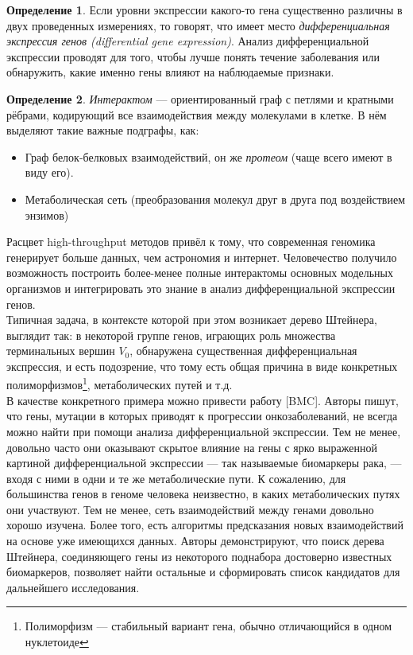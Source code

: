 \documentclass[11pt,a4paper]{report}
\theoremstyle{definition}
\theoremstyle{definition}
\theoremstyle{definition}
\newtheorem{definition}{Определение}[section]
\begin{document}
	\begin{definition}
		Если уровни экспрессии какого-то гена существенно различны в двух проведенных измерениях, то говорят, что имеет место \textit{дифференциальная экспрессия генов (differential gene expression)}. Анализ дифференциальной экспрессии проводят для того, чтобы лучше понять течение заболевания или обнаружить, какие именно гены влияют на наблюдаемые признаки.
	\end{definition}
	\begin{definition}
		\textit{Интерактом} — ориентированный граф с петлями и кратными рёбрами, кодирующий все взаимодействия между молекулами в клетке. В нём выделяют такие важные подграфы, как:
		\begin{itemize}
			\item Граф белок-белковых взаимодействий, он же \textit{протеом} (чаще всего имеют в виду его).
			\item Метаболическая сеть (преобразования молекул друг в друга под воздействием энзимов)
		\end{itemize}
	\end{definition}
	\noindent Расцвет high-throughput методов привёл к тому, что современная геномика генерирует больше данных, чем астрономия и интернет. Человечество получило возможность построить более-менее полные интерактомы основных модельных организмов и интегрировать это знание в анализ дифференциальной экспрессии генов.\\
	
	\noindent Типичная задача, в контексте которой при этом возникает дерево Штейнера, выглядит так: в некоторой группе генов, играющих роль множества терминальных вершин $V_0$, обнаружена существенная дифференциальная экспрессия, и есть подозрение, что тому есть общая причина в виде конкретных полиморфизмов\footnote{Полиморфизм — стабильный вариант гена, обычно отличающийся в одном нуклетоиде}, метаболических путей и т.д.\\
	
	\noindent В качестве конкретного примера можно привести работу [BMC]. Авторы пишут, что гены, мутации в которых приводят к прогрессии онкозаболеваний, не всегда можно найти при помощи анализа дифференциальной экспрессии. Тем не менее, довольно часто они оказывают скрытое влияние на гены с ярко выраженной картиной дифференциальной экспрессии — так называемые биомаркеры рака, — входя с ними в одни и те же метаболические пути. К сожалению, для большинства генов в геноме человека неизвестно, в каких метаболических путях они участвуют. Тем не менее, сеть взаимодействий между генами довольно хорошо изучена. Более того, есть алгоритмы предсказания новых взаимодействий на основе уже имеющихся данных. Авторы демонстрируют, что поиск дерева Штейнера, соединяющего гены из некоторого поднабора достоверно известных биомаркеров, позволяет найти остальные и сформировать список кандидатов для дальнейшего исследования. \\
	 
\end{document}
